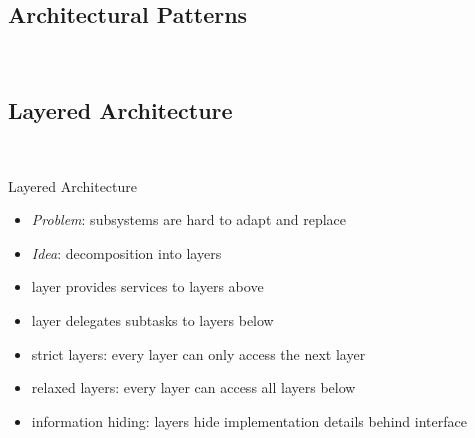 \subsection{Architectural Patterns}
\begin{frame}{\insertsubsection\ }
	\slideArchitecturalPattern
\end{frame}

\subsection{Layered Architecture}
\begin{frame}{\insertsubsection\ \normalsize{}}
	\begin{fancycolumns}[animation=none]
		\begin{definition}{{Layered Architecture \mysource{\sommerville}}}
			\begin{itemize}
				\item \emph{Problem}: subsystems are hard to adapt and replace
				\item \emph{Idea}: decomposition into layers 
				\item layer provides services to layers above
				\item layer delegates subtasks to layers below
				\item strict layers: every layer can only access the next layer
				\item relaxed layers: every layer can access all layers below %
				\item information hiding: layers hide implementation details behind interface
			\end{itemize}
		\end{definition}
		\nextcolumn
	\end{fancycolumns}
\end{frame}

